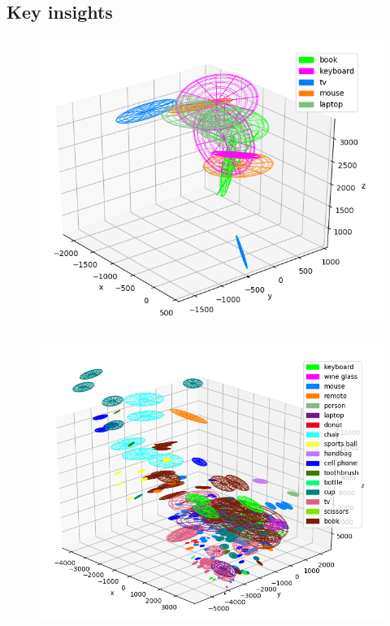 \documentclass[report.tex]{subfiles}
\begin{document}
\subsection{Key insights}
\begin{itemize}
\begin{figure}[H]
\centering
\begin{minipage}{.5\textwidth}
  \centering
  \includegraphics[width=\textwidth]{Images/batch_14_2bookNaN.png}
  \label{fig:batch_14_2bookNaN}
\end{minipage}%
\begin{minipage}{.5\textwidth}
  \centering
  \includegraphics[width=\textwidth]{Images/incremental_236.png}
  \label{fig:incremental_236}
\end{minipage}
\end{figure}


\end{itemize}
\end{document}
